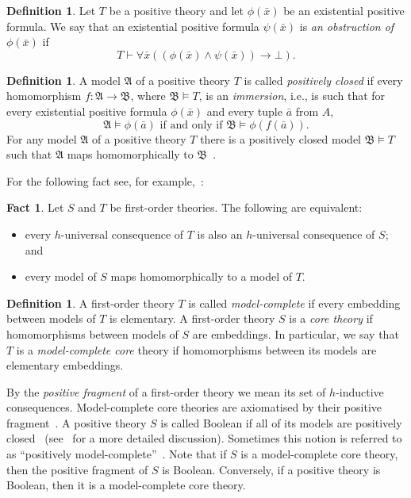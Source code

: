 \documentclass{amsart}
\theoremstyle{definition}
\newtheorem{definition}[theorem]{Definition}
\newtheorem{fact}[theorem]{Fact}
\theoremstyle{remark}
\numberwithin{equation}{section}
\newcommand{\fa}{\mathfrak{A}}
\newcommand{\fb}{\mathfrak{B}}
\begin{document}
\begin{definition} Let $T$ be a positive theory and let $\phi(\bar{x})$ be an existential positive formula. We say that an existential positive formula $\psi(\bar{x})$ is \emph{an obstruction of $\phi(\bar{x})$} if  
\[T\vdash \forall \bar{x} ((\phi(\bar{x})\wedge\psi(\bar{x}))\rightarrow \bot).\]
\end{definition}

\begin{definition} A model $\fa$ of a positive theory $T$ is called \emph{positively closed} if every homomorphism $f \colon \fa\to \fb$, where $\fb\vDash T$, is an \emph{immersion}, i.e., is such that for every existential positive formula $\phi(\bar{x})$ and every tuple $\bar{a}$ from $A$,
\[\fa\vDash\phi(\bar{a}) \text{ if and only if } \fb\vDash\phi(f(\bar{a})).\]
For any model $\fa$ of a positive theory $T$ there is a positively closed model $\fb\vDash T$ such that $\fa$ maps homomorphically to $\fb$~\cite[Lemma 1.20]{ben2003positive}. 
\end{definition}

For the following fact see, for example,~\cite[Proposition 2.1.14]{bodirsky2021complexity}:

\begin{fact}\label{fact:hconsequences} Let $S$ and $T$ be first-order theories. The following are equivalent:
\begin{itemize}
    \item every $h$-universal consequence of $T$ is also an $h$-universal consequence of $S$; and
    \item every model of $S$ maps homomorphically to a model of $T$.
\end{itemize}
\end{fact}

\begin{definition} A first-order theory $T$ is called \emph{model-complete} if every embedding between models of $T$ is elementary. A first-order theory $S$ is a \emph{core theory} if homomorphisms between models of $S$ are embeddings. In particular, we say that $T$ is a \emph{model-complete core} theory if homomorphisms between its models are elementary embeddings.
\end{definition}

By the \emph{positive fragment} of a first-order theory we mean its set of $h$-inductive consequences. Model-complete core theories are axiomatised by their positive fragment~\cite[Proposition 4.17]{BodHilsMartin-Journal}. A positive theory $S$ is called Boolean if all of its models are positively closed~\cite{dobrowolski2022kim} (see~\cite{kamsma2025positivelogicintroductionmodel} for a more detailed discussion). Sometimes this notion is referred to as  ``positively model-complete''~\cite{haykazyan2019spaces}. Note that if $S$ is a model-complete core  theory, then the positive fragment of $S$ is Boolean. Conversely, if a positive theory is Boolean, then it is a model-complete core  theory.
\end{document}
